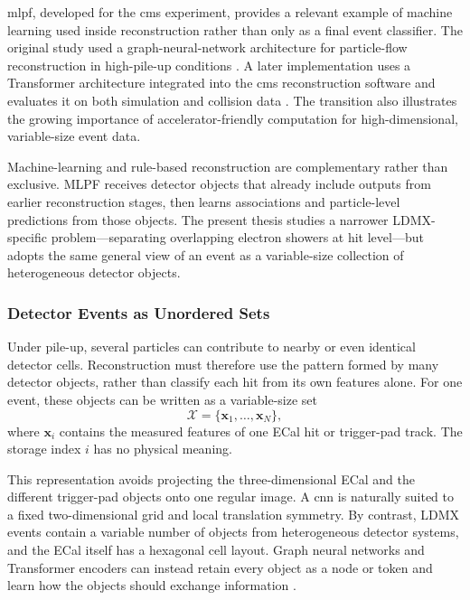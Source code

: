 
\Gls{mlpf}, developed for the \gls{cms} experiment, provides a relevant
example of machine learning used inside reconstruction rather than only as a
final event classifier. The original study used a graph-neural-network
architecture for particle-flow reconstruction in high-pile-up conditions
\cite{pata2021-mlpf}. A later implementation uses a Transformer architecture
integrated into the \gls{cms} reconstruction software and evaluates it on both
simulation and collision data \cite{pata2026-mlpf}. The transition also
illustrates the growing importance of accelerator-friendly computation for
high-dimensional, variable-size event data.

Machine-learning and rule-based reconstruction are complementary rather than
exclusive. MLPF receives detector objects that already include outputs from
earlier reconstruction stages, then learns associations and particle-level
predictions from those objects. The present thesis studies a narrower
LDMX-specific problem---separating overlapping electron showers at hit
level---but adopts the same general view of an event as a variable-size
collection of heterogeneous detector objects.

\subsubsection{Detector Events as Unordered Sets}
\label{sec:detector_set_background}

Under pile-up, several particles can contribute to nearby or even identical
detector cells. Reconstruction must therefore use the pattern formed by many
detector objects, rather than classify each hit from its own features alone.
For one event, these objects can be written as a variable-size set
\begin{equation}
    \mathcal{X}
    =
    \{\mathbf{x}_1,\ldots,\mathbf{x}_N\},
\end{equation}
where \(\mathbf{x}_i\) contains the measured features of one ECal hit or
trigger-pad track. The storage index \(i\) has no physical meaning.

This representation avoids projecting the three-dimensional ECal and the
different trigger-pad objects onto one regular image. A \gls{cnn} is naturally
suited to a fixed two-dimensional grid and local translation symmetry. By
contrast, LDMX events contain a variable number of objects from heterogeneous
detector systems, and the ECal itself has a hexagonal cell layout. Graph
neural networks and Transformer encoders can instead retain every object as a
node or token and learn how the objects should exchange information
\cite{duarte2020-gnn-tracking,lee2019-set-transformer}.


